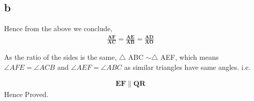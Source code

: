 \documentclass{beamer}
\renewcommand{\vec}[1]{\mathbf{#1}}
\begin{document}
\subsection{b}
\begin{frame}
Hence from the above we conclude,
\begin{align}
\vec{\frac{AF}{AC}} = \vec{\frac{AE}{AB}} = \vec{\frac{AD}{AO}}
\end{align}

As the ratio of the sides is the same, $\triangle$ ABC $\sim \triangle$ AEF, which means $\angle{AFE} = \angle{ACB}$ and $\angle{AEF} = \angle{ABC}$ as similar triangles have same angles.
i.e. 

\begin{align}
\vec{EF} \parallel \vec{QR}
\end{align}
Hence Proved.
\end{frame}
\end{document}
